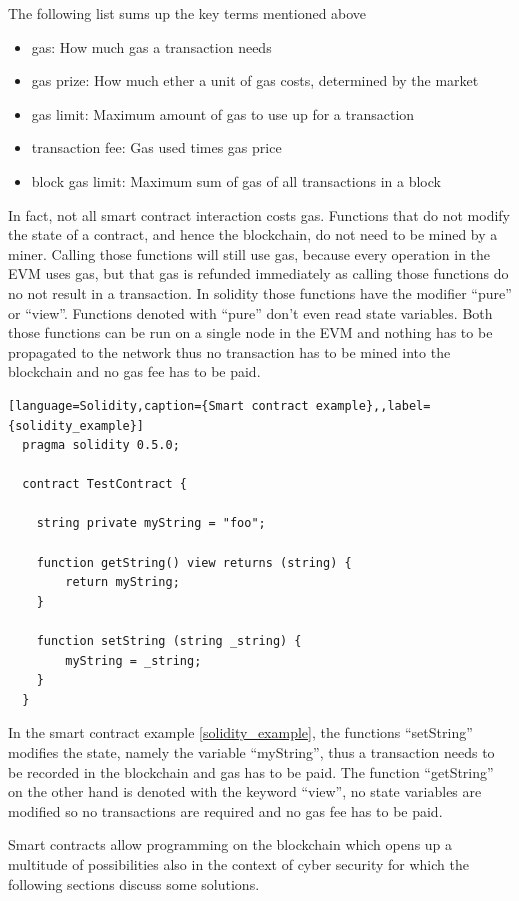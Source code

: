 The following list sums up the key terms mentioned above
\begin{itemize}
  \item {gas: How much gas a transaction needs }
  \item {gas prize: How much ether a unit of gas costs, determined by the market}
  \item {gas limit: Maximum amount of gas to use up for a transaction}
  \item {transaction fee: Gas used times gas price}
  \item {block gas limit: Maximum sum of gas of all transactions in a block}

\end{itemize}

In fact, not all smart contract interaction costs gas. Functions that do not modify the state of a contract, and hence the blockchain, do not need to be mined by a miner.
Calling those functions will still use gas, because every operation in the EVM uses gas, but that gas is refunded immediately as calling those functions do no not result in a transaction.
In solidity those functions have the modifier ``pure'' or ``view''. Functions denoted with ``pure'' don't even read state variables. Both those functions can be run on a single node in the EVM and
nothing has to be propagated to the network thus no transaction has to be mined into the blockchain and no gas fee has to be paid.



\begin{lstlisting}[language=Solidity,caption={Smart contract example},,label={solidity_example}]
  pragma solidity 0.5.0;

  contract TestContract {

    string private myString = "foo";

    function getString() view returns (string) {
        return myString;
    }

    function setString (string _string) {
        myString = _string;
    }
  }
  \end{lstlisting}

In the smart contract example \ref{solidity_example}, the functions ``setString'' modifies the state, namely the variable ``myString'', thus a transaction needs to be recorded in the blockchain and gas has to be paid.
The function ``getString'' on the other hand is denoted with the keyword ``view'', no state variables are modified so no transactions are required and no gas fee has to be paid.

Smart contracts allow programming on the blockchain which opens up a multitude of possibilities also in the context of cyber security for which the following sections discuss some solutions.


